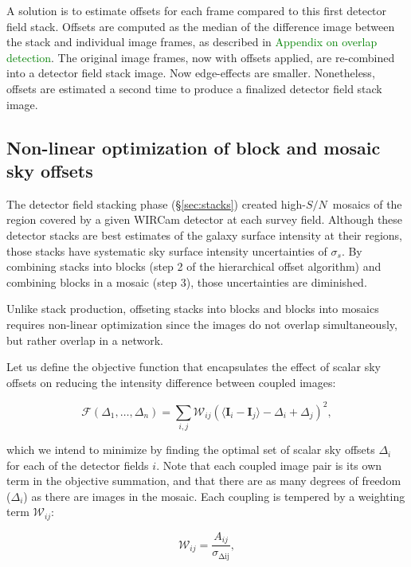 \documentclass[iop]{emulateapj}
\newcommand{\vect}[1]{\boldsymbol{#1}} %
\newcommand{\sn}{\ensuremath{S/N}} %
\newcommand{\todo}[1]{\textcolor{green}{#1}}
\begin{document}
A solution is to estimate offsets for each frame compared to this first detector field stack. Offsets are computed as the median of the difference image between the stack and individual image frames, as described in \todo{Appendix on overlap detection}. The original image frames, now with offsets applied, are re-combined into a detector field stack image. Now edge-effects are smaller. Nonetheless, offsets are estimated a second time to produce a finalized detector field stack image.

\subsection{Non-linear optimization of block and mosaic sky offsets}

The detector field stacking phase (\S \ref{sec:stacks}) created high-\sn\ mosaics of the region covered by a given WIRCam detector at each survey field. Although these detector stacks are best estimates of the galaxy surface intensity at their regions, those stacks have systematic sky surface intensity uncertainties of $\sigma_s$. By combining stacks into blocks (step 2 of the hierarchical offset algorithm) and combining blocks in a mosaic (step 3), those uncertainties are diminished.

Unlike stack production, offseting stacks into blocks and blocks into mosaics requires non-linear optimization since the images do not overlap simultaneously, but rather overlap in a network.

Let us define the objective function that encapsulates the effect of scalar sky offsets on reducing the intensity difference between coupled images:

\begin{equation}
    \mathcal{F} \left(\Delta_1,\ldots,\Delta_n \right) = \sum_{i,j} \mathcal{W}_{ij} \left( \langle \vect{I}_i - \vect{I}_j \rangle - \Delta_i + \Delta_j \right)^2,
    \label{eq:objf}
\end{equation}

\noindent which we intend to minimize by finding the optimal set of scalar sky offsets $\Delta_i$ for each of the detector fields $i$. Note that each coupled image pair is its own term in the objective summation, and that there are as many degrees of freedom ($\Delta_i$) as there are images in the mosaic. Each coupling is tempered by a weighting term $\mathcal{W}_{ij}$:

\begin{equation}
    \mathcal{W}_{ij} = \frac{A_{ij}}{\sigma_{\mathrm{\Delta ij}}},
\end{equation}
\end{document}
